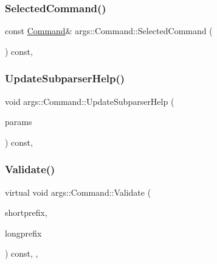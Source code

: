 \subsubsection{\texorpdfstring{Selected\+Command()}{SelectedCommand()}\hspace{0.1cm}{\footnotesize\ttfamily [2/2]}}
{\footnotesize\ttfamily const \hyperlink{classargs_1_1_command}{Command}\& args\+::\+Command\+::\+Selected\+Command (\begin{DoxyParamCaption}{ }\end{DoxyParamCaption}) const\hspace{0.3cm}{\ttfamily [inline]}, {\ttfamily [protected]}}

\mbox{\label{classargs_1_1_command_a93c6c07576c78fabd319d8d0b872c5b1}} 
\subsubsection{\texorpdfstring{Update\+Subparser\+Help()}{UpdateSubparserHelp()}}
{\footnotesize\ttfamily void args\+::\+Command\+::\+Update\+Subparser\+Help (\begin{DoxyParamCaption}\item[{const \hyperlink{structargs_1_1_help_params}{Help\+Params} \&}]{params }\end{DoxyParamCaption}) const\hspace{0.3cm}{\ttfamily [inline]}, {\ttfamily [protected]}}

\mbox{\label{classargs_1_1_command_ad39b397a91af426f0ecbda9d29d7bbe0}} 
\subsubsection{\texorpdfstring{Validate()}{Validate()}}
{\footnotesize\ttfamily virtual void args\+::\+Command\+::\+Validate (\begin{DoxyParamCaption}\item[{const std\+::string \&}]{shortprefix,  }\item[{const std\+::string \&}]{longprefix }\end{DoxyParamCaption}) const\hspace{0.3cm}{\ttfamily [inline]}, {\ttfamily [override]}, {\ttfamily [virtual]}}



